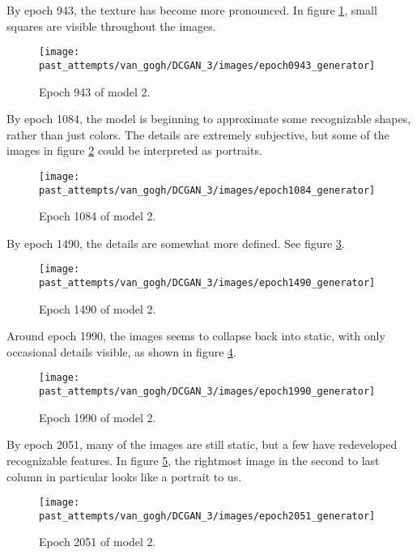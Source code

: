 \documentclass[11pt,letterpaper]{article}
\begin{document}
				By epoch 943, the texture has become more pronounced.
				In figure \ref{fig:cgvg:epoch0943generator}, small squares are visible throughout the images.
				\begin{figure}
					\centering
					\texttt{[image: past\_attempts/van\_gogh/DCGAN\_3/images/epoch0943\_generator]}
					\caption{Epoch 943 of model 2.}
					\label{fig:cgvg:epoch0943generator}
				\end{figure}

				By epoch 1084, the model is beginning to approximate some recognizable shapes, rather than just colors.
				The details are extremely subjective, but some of the images in figure \ref{fig:cgvg:epoch1084generator} could be interpreted as portraits.
				\begin{figure}
					\centering
					\texttt{[image: past\_attempts/van\_gogh/DCGAN\_3/images/epoch1084\_generator]}
					\caption{Epoch 1084 of model 2.}
					\label{fig:cgvg:epoch1084generator}
				\end{figure}

				By epoch 1490, the details are somewhat more defined.
				See figure \ref{fig:cgvg:epoch1490generator}.
				\begin{figure}
					\centering
					\texttt{[image: past\_attempts/van\_gogh/DCGAN\_3/images/epoch1490\_generator]}
					\caption{Epoch 1490 of model 2.}
					\label{fig:cgvg:epoch1490generator}
				\end{figure}

				Around epoch 1990, the images seems to collapse back into static, with only occasional details visible, as shown in figure \ref{fig:cgvg:epoch1990generator}.
				\begin{figure}
					\centering
					\texttt{[image: past\_attempts/van\_gogh/DCGAN\_3/images/epoch1990\_generator]}
					\caption{Epoch 1990 of model 2.}
					\label{fig:cgvg:epoch1990generator}
				\end{figure}

				By epoch 2051, many of the images are still static, but a few have redeveloped recognizable features.
				In figure \ref{fig:cgvg:epoch2051generator}, the rightmost image in the second to last column in particular looks like a portrait to us.
				\begin{figure}
					\centering
					\texttt{[image: past\_attempts/van\_gogh/DCGAN\_3/images/epoch2051\_generator]}
					\caption{Epoch 2051 of model 2.}
					\label{fig:cgvg:epoch2051generator}
				\end{figure}
\end{document}
